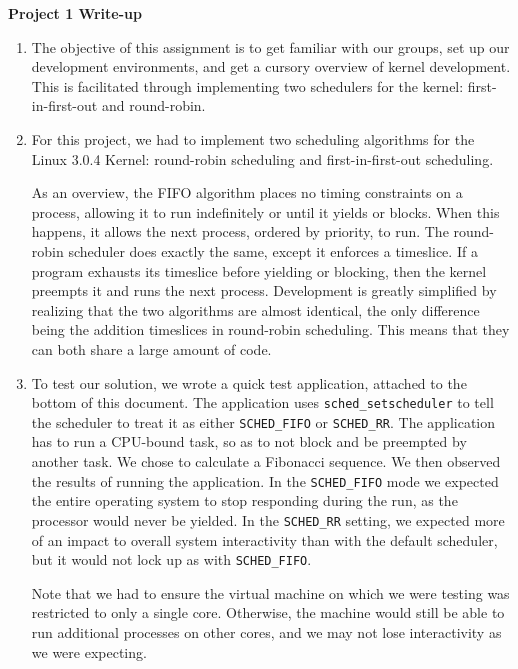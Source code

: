 \documentclass[12pt,letterpaper]{article}
\begin{document}
{\center\textbf{Project 1 Write-up} \\}

\begin{enumerate}

\item The objective of this assignment is to get familiar with our groups, set
  up our development environments, and get a cursory overview of kernel
  development.  This is facilitated through implementing two schedulers for the
  kernel: first-in-first-out and round-robin.

\item For this project, we had to implement two scheduling algorithms for the
  Linux 3.0.4 Kernel: round-robin scheduling and first-in-first-out scheduling.

  As an overview, the FIFO algorithm places no timing constraints on a process,
  allowing it to run indefinitely or until it yields or blocks.  When this
  happens, it allows the next process, ordered by priority, to run.  The
  round-robin scheduler does exactly the same, except it enforces a timeslice.
  If a program exhausts its timeslice before yielding or blocking, then the
  kernel preempts it and runs the next process.  Development is greatly
  simplified by realizing that the two algorithms are almost identical, the only
  difference being the addition timeslices in round-robin scheduling.  This
  means that they can both share a large amount of code.

\item To test our solution, we wrote a quick test application, attached to the
  bottom of this document.  The application uses \texttt{sched\_setscheduler} to
  tell the scheduler to treat it as either \texttt{SCHED\_FIFO} or
  \texttt{SCHED\_RR}.  The application has to run a CPU-bound task, so as to not
  block and be preempted by another task.  We chose to calculate a Fibonacci
  sequence.  We then observed the results of running the application.  In the
  \texttt{SCHED\_FIFO} mode we expected the entire operating system to stop
  responding during the run, as the processor would never be yielded.  In the
  \texttt{SCHED\_RR} setting, we expected more of an impact to overall system
  interactivity than with the default scheduler, but it would not lock up as
  with \texttt{SCHED\_FIFO}.

  Note that we had to ensure the virtual machine on which we were testing was
  restricted to only a single core.  Otherwise, the machine would still be able
  to run additional processes on other cores, and we may not lose interactivity
  as we were expecting.


\end{enumerate}
\end{document}
